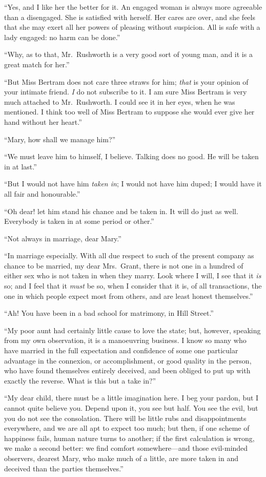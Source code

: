 \documentclass{article}
\begin{document}
``Yes, and I like her the better for it.  An engaged
woman is always more agreeable than a disengaged.
She is satisfied with herself.  Her cares are over,
and she feels that she may exert all her powers of pleasing
without suspicion.  All is safe with a lady engaged:
no harm can be done.''

``Why, as to that, Mr.\ Rushworth is a very good sort
of young man, and it is a great match for her.''

``But Miss Bertram does not care three straws for him;
\emph{that} is your opinion of your intimate friend.  \emph{I} do
not subscribe to it.  I am sure Miss Bertram is very much
attached to Mr.\ Rushworth.  I could see it in her eyes,
when he was mentioned.  I think too well of Miss Bertram
to suppose she would ever give her hand without her heart.''

``Mary, how shall we manage him?''

``We must leave him to himself, I believe.  Talking does
no good.  He will be taken in at last.''

``But I would not have him \emph{taken in}; I would not have
him duped; I would have it all fair and honourable.''

``Oh dear! let him stand his chance and be taken in.
It will do just as well.  Everybody is taken in at some
period or other.''

``Not always in marriage, dear Mary.''

``In marriage especially.  With all due respect to such
of the present company as chance to be married, my dear
Mrs.\ Grant, there is not one in a hundred of either sex
who is not taken in when they marry.  Look where I will,
I see that it \emph{is} so; and I feel that it \emph{must} be so,
when I consider that it is, of all transactions, the one
in which people expect most from others, and are least
honest themselves.''

``Ah!  You have been in a bad school for matrimony,
in Hill Street.''

``My poor aunt had certainly little cause to love
the state; but, however, speaking from my own observation,
it is a manoeuvring business.  I know so many who
have married in the full expectation and confidence
of some one particular advantage in the connexion,
or accomplishment, or good quality in the person, who have
found themselves entirely deceived, and been obliged
to put up with exactly the reverse.  What is this but a take in?''

``My dear child, there must be a little imagination here.
I beg your pardon, but I cannot quite believe you.
Depend upon it, you see but half.  You see the evil,
but you do not see the consolation.  There will be
little rubs and disappointments everywhere, and we
are all apt to expect too much; but then, if one scheme
of happiness fails, human nature turns to another;
if the first calculation is wrong, we make a second better:
we find comfort somewhere---and those evil-minded observers,
dearest Mary, who make much of a little, are more taken
in and deceived than the parties themselves.''
\end{document}

